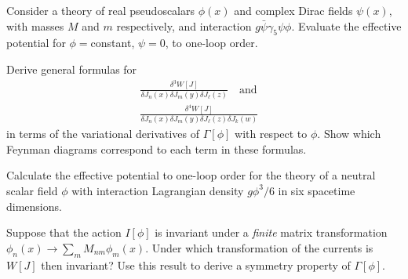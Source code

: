 
\begin{enumerate}
   Consider a theory of real pseudoscalars $\phi(x)$ and complex Dirac fields
  $\psi(x)$, with masses $M$ and $m$ respectively, and interaction
  $g\bar\psi\gamma_5\psi\phi$. Evaluate the effective potential for $\phi={}$constant,
  $\psi=0$, to one-loop order.

   Derive general formulas for
  \begin{gather*}
    \frac{\delta^3W[J]}{\delta J_n(x)\delta J_m(y)\delta J_\ell(z)}
    \quad\text{and}\quad \\
    \frac{\delta^4W[J]}{\delta J_n(x)\delta J_m(y)\delta J_\ell(z)\delta J_k(w)}
  \end{gather*}
  in terms of the variational derivatives of $\Gamma[\phi]$ with respect to $\phi$.
  Show which Feynman diagrams correspond to each term in these formulas.

   Calculate the effective potential to one-loop order for the theory of a
  neutral scalar field $\phi$ with interaction Lagrangian density $g\phi^3/6$ in
  six spacetime dimensions.

   Suppose that the action $I[\phi]$ is invariant under a \emph{finite} matrix
  transformation $\phi_n(x)\longrightarrow\sum_m M_{nm}\phi_m(x)$. Under which
  transformation of the currents is $W[J]$ then invariant? Use this result to derive
  a symmetry property of $\Gamma[\phi]$.
\end{enumerate}

